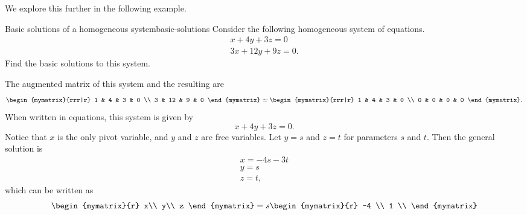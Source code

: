 We explore this further in the following example.

\begin{example}{Basic solutions of a homogeneous system}{basic-solutions}
  Consider the following homogeneous system of equations.
  \begin{equation}\label{eqn:basic-solutions-1}
    \begin{array}{c}
      x + 4y + 3z = 0 \\
      3x + 12y + 9z = 0.
    \end{array}
  \end{equation}
  Find the basic solutions to this system.
\end{example}

\begin{solution}
  The augmented matrix of this system and the resulting {\rref} are
  \begin{equation*}
    \begin{mymatrix}{rrr|r}
      1 & 4 & 3 & 0 \\
      3 & 12 & 9 & 0
    \end{mymatrix}
    \roweq
    \begin{mymatrix}{rrr|r}
      1 & 4 & 3 & 0 \\
      0 & 0 & 0 & 0
    \end{mymatrix}.
  \end{equation*}
  When written in equations, this system is given by
  \begin{equation*}
    x + 4y +3z=0.
  \end{equation*}
  Notice that $x$ is the only pivot variable, and $y$ and $z$ are free
  variables. Let $y = s$ and $z=t$ for parameters $s$ and $t$. Then the
  general solution is
  \begin{equation*}
    \begin{array}{c}
      x = -4s - 3t \\
      y = s \\
      z = t,
    \end{array}
  \end{equation*}
  which can be written as
  \begin{equation*}
    \begin{mymatrix}{r}
      x\\
      y\\
      z
    \end{mymatrix}
    =
    s
    \begin{mymatrix}{r}
      -4 \\
      1 \\

\end{mymatrix}
\end{equation*}
\end{solution}
